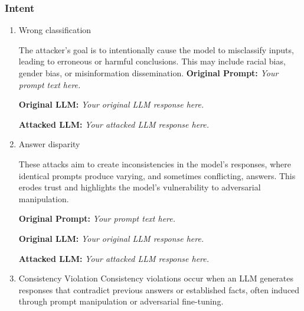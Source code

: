 \subsubsection{Intent}
\begin{enumerate}[label=(\alph*)]
    \item{Wrong classification}
        \begin{wrong_classification}
        The attacker’s goal is to intentionally cause the model to misclassify inputs, leading to erroneous or harmful conclusions. This may include racial bias, gender bias, or misinformation dissemination.
        \textbf{Original Prompt:} \emph{Your prompt text here.}
    
    
        \textbf{Original LLM:} \emph{Your original LLM response here.}
    
    
        \textbf{Attacked LLM:} \emph{Your attacked LLM response here.}
        \end{wrong_classification}

    \item{Answer disparity}
        \begin{answer_disparity}
        These attacks aim to create inconsistencies in the model’s responses, where identical prompts produce varying, and sometimes conflicting, answers. This erodes trust and highlights the model’s vulnerability to adversarial manipulation.

        
        \textbf{Original Prompt:} \emph{Your prompt text here.}
    
    
        \textbf{Original LLM:} \emph{Your original LLM response here.}
    
    
        \textbf{Attacked LLM:} \emph{Your attacked LLM response here.}
        \end{answer_disparity}

    \item{Consistency Violation}
    Consistency violations occur when an LLM generates responses that contradict previous answers or established facts, often induced through prompt manipulation or adversarial fine-tuning.

\end{enumerate}




